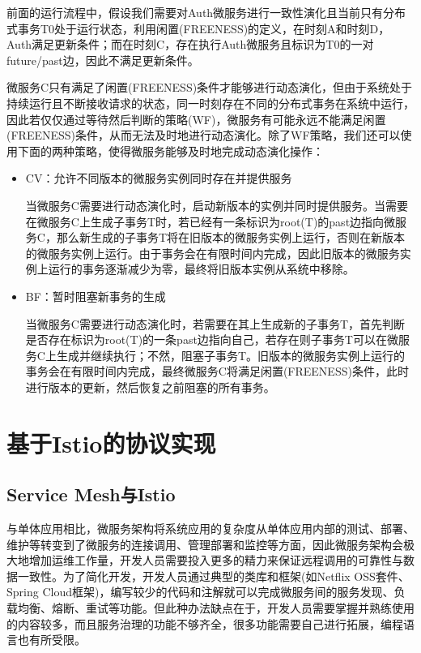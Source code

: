 \documentclass[12pt,a4paper]{article}
\theoremstyle{definition}
\begin{document}
前面的运行流程中，假设我们需要对Auth微服务进行一致性演化且当前只有分布式事务T0处于运行状态，利用闲置(FREENESS)的定义，在时刻A和时刻D，Auth满足更新条件；而在时刻C，存在执行Auth微服务且标识为T0的一对future/past边，因此不满足更新条件。

微服务C只有满足了闲置(FREENESS)条件才能够进行动态演化，但由于系统处于持续运行且不断接收请求的状态，同一时刻存在不同的分布式事务在系统中运行，因此若仅仅通过等待然后判断的策略(WF)，微服务有可能永远不能满足闲置(FREENESS)条件，从而无法及时地进行动态演化。除了WF策略，我们还可以使用下面的两种策略，使得微服务能够及时地完成动态演化操作：

\begin{itemize}

\item {CV：允许不同版本的微服务实例同时存在并提供服务

当微服务C需要进行动态演化时，启动新版本的实例并同时提供服务。当需要在微服务C上生成子事务T时，若已经有一条标识为root(T)的past边指向微服务C，那么新生成的子事务T将在旧版本的微服务实例上运行，否则在新版本的微服务实例上运行。由于事务会在有限时间内完成，因此旧版本的微服务实例上运行的事务逐渐减少为零，最终将旧版本实例从系统中移除。}

\item{BF：暂时阻塞新事务的生成

当微服务C需要进行动态演化时，若需要在其上生成新的子事务T，首先判断是否存在标识为root(T)的一条past边指向自己，若存在则子事务T可以在微服务C上生成并继续执行；不然，阻塞子事务T。旧版本的微服务实例上运行的事务会在有限时间内完成，最终微服务C将满足闲置(FREENESS)条件，此时进行版本的更新，然后恢复之前阻塞的所有事务。}
\end{itemize}

\newpage
\section{基于Istio的协议实现}\label{baseistio}
\subsection{Service Mesh与Istio}

与单体应用相比，微服务架构将系统应用的复杂度从单体应用内部的测试、部署、维护等转变到了微服务的连接调用、管理部署和监控等方面，因此微服务架构会极大地增加运维工作量，开发人员需要投入更多的精力来保证远程调用的可靠性与数据一致性。为了简化开发，开发人员通过典型的类库和框架(如Netflix OSS套件、Spring Cloud框架)，编写较少的代码和注解就可以完成微服务间的服务发现、负载均衡、熔断、重试等功能。但此种办法缺点在于，开发人员需要掌握并熟练使用的内容较多，而且服务治理的功能不够齐全，很多功能需要自己进行拓展，编程语言也有所受限。
\end{document}
